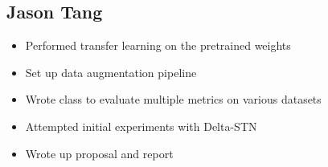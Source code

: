 \documentclass[11pt,titlepage]{article}
\begin{document}
\subsection*{Jason Tang}
\begin{itemize}
    \item Performed transfer learning on the pretrained weights
    \item Set up data augmentation pipeline
    \item Wrote class to evaluate multiple metrics on various datasets
    \item Attempted initial experiments with Delta-STN
    \item Wrote up proposal and report
\end{itemize}





\end{document}
